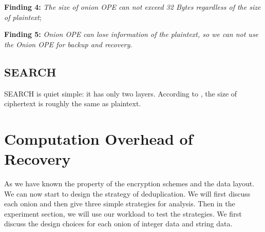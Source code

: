 


\textbf{Finding 4:} \textit{The size of onion OPE can not exceed 32 Bytes regardless of the size of plaintext};

\textbf{Finding 5:} \textit{Onion OPE can lose information of the plaintext, so we can not use the Onion OPE for backup and recovery}.

\subsection{SEARCH}
SEARCH is quiet simple: it has only two layers. According to \citep{song2000practical}, the size of ciphertext is roughly the same as plaintext.

\section{Computation Overhead of Recovery}
As we have known the property of the encryption schemes and the data layout. We can now start to design the strategy of deduplication. We will first discuss each onion and then give three simple strategies for analysis. Then in the experiment section, we will use our workload to test the strategies. We first discuss the design choices for each onion of integer data and string data. 



